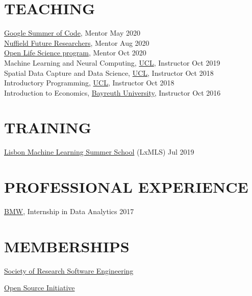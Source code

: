 \documentclass{cv}
\begin{document}
\section{TEACHING}

\href{https://summerofcode.withgoogle.com/archive/2020/projects/6262209727954944/}{Google Summer of Code}, Mentor \hfill May 2020 \\

\href{https://www.nuffieldfoundation.org/students-teachers/nuffield-future-researchers}{Nuffield Future Researchers}, Mentor \hfill Aug 2020 \\

\href{https://openlifesci.org}{Open Life Science program}, Mentor \hfill Oct 2020 \\

Machine Learning and Neural Computing, \href{https://www.ucl.ac.uk/}{UCL}, Instructor \hfill Oct 2019 \\ 

Spatial Data Capture and Data Science, \href{https://www.ucl.ac.uk/}{UCL}, Instructor \hfill Oct 2018 \\

Introductory Programming, \href{https://www.ucl.ac.uk/}{UCL}, Instructor \hfill Oct 2018 \\

Introduction to Economics, \href{https://www.uni-bayreuth.de/en/}{Bayreuth University}, Instructor \hfill Oct 2016 \\

\section{TRAINING}

\href{http://lxmls.it.pt/}{Lisbon Machine Learning Summer School} (LxMLS) \hfill Jul 2019 \\


\section{PROFESSIONAL EXPERIENCE}

\href{https://www.bmw.com/en/index.html}{BMW}, Internship in Data Analytics  \hfill 2017 



\section{MEMBERSHIPS}

\href{https://society-rse.org/}{Society of Research Software Engineering}
\vspace{5pt}

\href{http://opensource.org}{Open Source Initiative}
\end{document}
